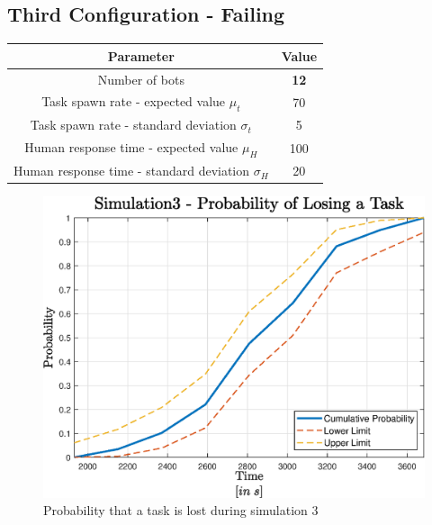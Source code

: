 \documentclass[10pt,a4paper]{article}
\begin{document}
		\subsection{Third Configuration - Failing}
			\begin{center}
				\begin{tabular}{ |c|c|}
					\hline
					Parameter & Value\\
					\hline
					\hline
					Number of bots & \textbf{12}\\
					\hline
					Task spawn rate - expected value $\mu_t$ & 70\\
					\hline					
					Task spawn rate - standard deviation $\sigma_t$ & 5\\
					\hline
					Human response time - expected value $\mu_H$ & 100\\
					\hline					
					Human response time - standard deviation $\sigma_H$ & 20\\
					\hline
				\end{tabular}
			\end{center}
			\begin{figure}[H]
				\centering
					\includegraphics[scale = 0.7]{Images/Simulation3}
					\caption{Probability that a task is lost during simulation 3}
					\label{fig:sim3}
			\end{figure}
\end{document}
